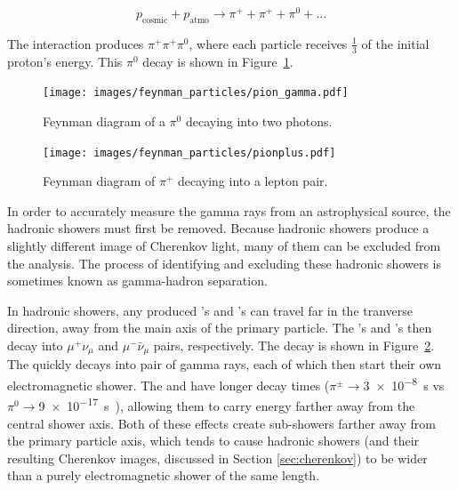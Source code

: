   \begin{equation}\label{eqn:protoncollision}
    p_{\textrm{cosmic}} + p_{\textrm{atmo}} \rightarrow \pi^+ + \pi^+ + \pi^0 + ...
  \end{equation}
  
  The interaction produces $\pi^+\pi^+\pi^0$, where each particle receives \nicetilde $\frac{1}{3}$ of the initial proton's energy.
  This $\pi^{0}$ decay is shown in Figure~\ref{fig:feynman_pi0}.
  
  \begin{figure}[ht]
    \centering
    \texttt{[image: images/feynman\_particles/pion\_gamma.pdf]}
    \caption[Feynman Diagram of $\pi^{0}$ Decay]{
      Feynman diagram of a $\pi^{0}$ decaying into two photons.
      \CaptionBlankLine
    }
    \label{fig:feynman_pi0}
  \end{figure}

  \begin{figure}[ht]
    \centering
    \texttt{[image: images/feynman\_particles/pionplus.pdf]}
    \caption[Feynman Diagram of $\pi^{+}$ Decay]{
      Feynman diagram of $\pi^{+}$ decaying into a lepton pair.
      \CaptionBlankLine
    }
    \label{fig:feynman_piplus}
  \end{figure}
  
  In order to accurately measure the gamma rays from an astrophysical source, the hadronic showers must first be removed.
  Because hadronic showers produce a slightly different image of Cherenkov light, many of them can be excluded from the analysis.
  The process of identifying and excluding these hadronic showers is sometimes known as gamma-hadron separation.

  In hadronic showers, any produced \pip{}'s and \pim{}'s can travel far in the tranverse direction, away from the main axis of the primary particle.
  The \pip{}'s and \pim{}'s then decay into $\mu^{+}\nu_{\mu}$ and $\mu^{-}\bar{\nu}_{\mu}$ pairs, respectively.
  The \pip{} decay is shown in Figure~\ref{fig:feynman_piplus}.
  The \pio{} quickly decays into pair of gamma rays, each of which then start their own electromagnetic shower.
  The \pip{} and \pim{} have longer decay times ($\pi^{\pm} \rightarrow $\SI{3e-8}{s} vs $\pi^{0} \rightarrow $\SI{9e-17}{s}~\cite{pdg_2014}), allowing them to carry energy farther away from the central shower axis.
  Both of these effects create sub-showers farther away from the primary particle axis, which tends to cause hadronic showers (and their resulting Cherenkov images, discussed in Section \ref{sec:cherenkov}) to be wider than a purely electromagnetic shower of the same length. 
  
